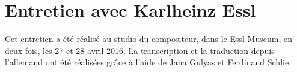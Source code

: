 \documentclass[a4paper,12pt]{article}
\newcommand{\guill}[1]{«~#1~»}
\newcommand{\tpp}[0]{[\dots]}
\begin{document}
%
%
%


\newpage
\section{Entretien avec Karlheinz Essl}

Cet entretien a été réalisé au studio du compositeur, dans le Essl Museum, en deux fois, les 27 et 28 avril 2016. La transcription et la traduction depuis l'allemand ont été réalisées grâce à l'aide de Jana Gulyas et Ferdinand Schlie.
\end{document}
